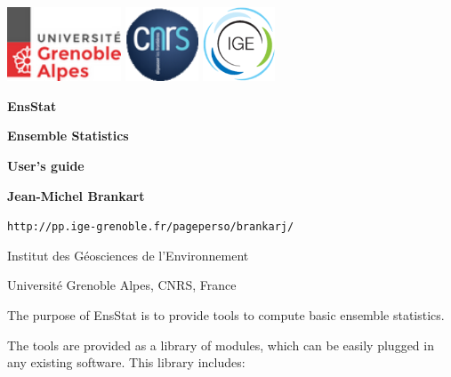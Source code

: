 \documentclass[11pt]{article}
\begin{document}
\pagestyle{empty}

\centerline{
\includegraphics[height=22mm]{Logos/logo_uga.png}
\hspace{5mm}
\includegraphics[height=22mm]{Logos/logo_cnrs.png}
\hfill
\includegraphics[height=22mm]{Logos/logo_ige.png}
}

\vspace{20mm}

\begin{center}

{\Huge\bf EnsStat}

\vspace{10mm}

{\Large\bf Ensemble Statistics}

\vspace{10mm}

{\Large\bf User's guide}

\vspace{10mm}

{\large\bf Jean-Michel Brankart}

\vspace{5mm}
{\tt http://pp.ige-grenoble.fr/pageperso/brankarj/}

\vspace{5mm}
{\large Institut des G\'eosciences de l'Environnement}

\vspace{1mm}
{\large Universit\'e Grenoble Alpes, CNRS, France}

\end{center}

\vspace{20mm}
The purpose of EnsStat is to provide tools
to compute basic ensemble statistics.

The tools are provided as a library of modules,
which can be easily plugged in any existing software.
This library includes:
\end{document}
